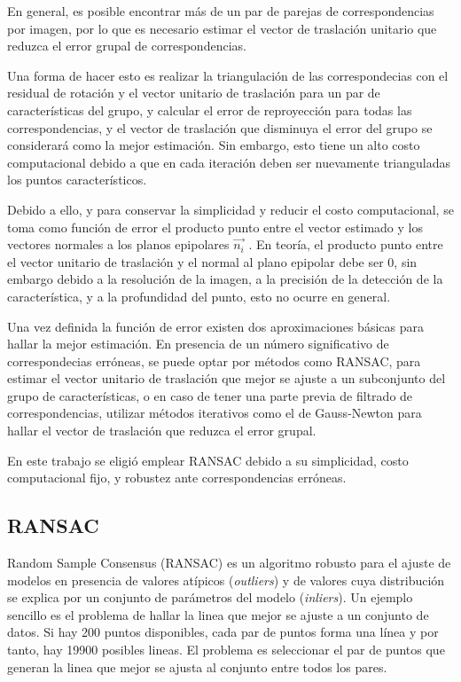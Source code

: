 En general, es posible encontrar más de un par de parejas de correspondencias por imagen, por lo que es necesario estimar el vector de traslación unitario que reduzca el error grupal de correspondencias.

Una forma de hacer esto es realizar la triangulación de las correspondecias con el residual de rotación y  el vector unitario de traslación para un par de características del grupo, y calcular el error de reproyección para todas las correspondencias, y el vector de traslación que disminuya el error del grupo se considerará como la mejor estimación. Sin embargo, esto tiene un alto costo computacional debido a que en cada iteración deben ser nuevamente trianguladas los puntos característicos.

Debido a ello, y para conservar la simplicidad y reducir el costo computacional, se toma como función de error el producto punto entre el vector estimado y los vectores normales a los planos epipolares $\overset { \rightarrow  }{ { n }_{ i } } $ . En teoría, el producto punto entre el vector unitario de traslación y el normal al plano epipolar debe ser $0$, sin embargo debido a la resolución de la imagen, a la precisión de la detección de la característica, y a la profundidad del punto, esto  no ocurre en general.

Una vez definida la función de error existen dos aproximaciones básicas para hallar la mejor estimación.
En presencia de un número significativo de correspondecias erróneas, se puede optar por métodos como RANSAC, para estimar el vector unitario de traslación que mejor se ajuste a un subconjunto del grupo de características, o en caso de tener una parte previa de filtrado de correspondencias, utilizar métodos iterativos como el de Gauss-Newton para hallar el vector de traslación que reduzca el error grupal.

En este trabajo se eligió emplear RANSAC debido a su simplicidad, costo computacional fijo, y robustez ante correspondencias erróneas.

\subsection{RANSAC}

Random Sample Consensus (RANSAC) es un algoritmo robusto para el ajuste de modelos en presencia de valores atípicos (\textit{outliers}) y de valores  cuya distribución se explica por un conjunto de parámetros del modelo (\textit{inliers}). Un ejemplo sencillo es el problema de hallar la linea que mejor se ajuste a un conjunto de datos. Si hay 200 puntos disponibles, cada par de puntos forma una línea y por tanto, hay 19900 posibles lineas. El problema es seleccionar el par de puntos que generan la linea que mejor se ajusta al conjunto entre todos los pares.

